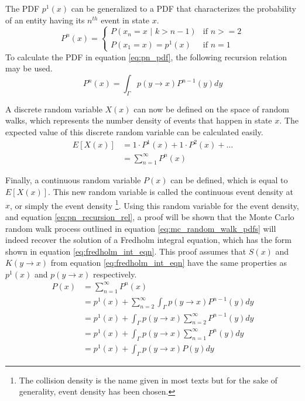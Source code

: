 The PDF $p^1(x)$ can be generalized to a PDF that characterizes the probability 
of an entity having its $n^{th}$ event in state $x$. 
\begin{equation}
  P^n(x) = 
  \begin{cases} 
    P(x_n = x \text{ | } k > n-1) & \text{if } n >= 2 \\
    P(x_1 = x) = p^1(x) & \text{if } n = 1 
  \end{cases}
  \label{eq:pn_pdf}
\end{equation}
To calculate the PDF in equation \ref{eq:pn_pdf}, the following recursion
relation may be used.
\begin{equation}
  P^n(x) = \int_{\Gamma} p(y \to x) P^{n-1}(y)dy
  \label{eq:pn_recursion_rel}
\end{equation}

A discrete random variable $X(x)$ can now be defined on the space of random 
walks, which represents the number density of events that happen in state $x$. 
The expected value of this discrete random variable can be calculated easily.
\begin{align}
  E[X(x)] & = 1 \cdot P^1(x) + 1 \cdot P^2(x) + \ldots \nonumber \\
  & = \sum_{n=1}^{\infty} P^n(x)
  \label{eq:expec_coll_dens}
\end{align}

Finally, a continuous random variable $P(x)$ can be defined, which is equal to
$E[X(x)]$. This new random variable is called the continuous event density 
at $x$, or simply the event density
\footnote{The collision density is the name given in most texts but for the
sake of generality, event density has been chosen.}. Using this random variable 
for the event density, and equation \ref{eq:pn_recursion_rel}, a proof will be 
shown that the Monte Carlo random walk process outlined in equation 
\ref{eq:mc_random_walk_pdfs} will indeed recover the solution of a Fredholm 
integral equation, which has the form shown in equation 
\ref{eq:fredholm_int_eqn}. This proof assumes that $S(x)$ and $K(y \to x)$ from 
equation \ref{eq:fredholm_int_eqn} have the same properties as $p^1(x)$ and 
$p(y \to x)$ respectively. 
\begin{align}
  P(x) & = \sum_{n=1}^{\infty} P^n(x) \nonumber \\
  & = p^1(x) + \sum_{n=2}^{\infty} \int_{\Gamma} p(y \to x) P^{n-1}(y)dy \nonumber\\
  & = p^1(x) + \int_{\Gamma} p(y \to x) \sum_{n=2}^{\infty} P^{n-1}(y)dy \nonumber\\
  & = p^1(x) + \int_{\Gamma} p(y \to x) \sum_{n=1}^{\infty} P^{n}(y)dy \nonumber\\
  & = p^1(x) + \int_{\Gamma} p(y \to x) P(y)dy \nonumber 
\end{align}

